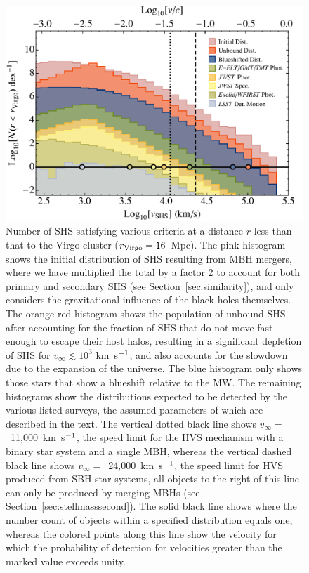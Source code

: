 \documentclass[a4paper,twocolumn]{emulateapj}
\begin{document}
{\begin{figure}
\centering\includegraphics[width=0.7\linewidth,clip=true]{histogram-2}
\caption{Number of SHS satisfying various criteria at a distance $r$ less than that to the Virgo cluster ($r_{\rm Virgo} = 16$~Mpc). The pink histogram shows the initial distribution of SHS resulting from MBH mergers, where we have multiplied the total by a factor 2 to account for both primary and secondary SHS (see Section~\ref{sec:similarity}), and only considers the gravitational influence of the black holes themselves. The orange-red histogram shows the population of unbound SHS after accounting for the fraction of SHS that do not move fast enough to escape their host halos, resulting in a significant depletion of SHS for $v_{\infty} \lesssim 10^{3}$ km~s$^{\smash{-1}}$, and also accounts for the slowdown due to the expansion of the universe. The blue histogram only shows those stars that show a blueshift relative to the MW. The remaining histograms show the distributions expected to be detected by the various listed surveys, the assumed parameters of which are described in the text. The vertical dotted black line shows $v_{\infty} =$~11,000~km~s$^{\smash{-1}}$, the speed limit for the HVS mechanism with a binary star system and a single MBH, whereas the vertical dashed black line shows $v_{\infty} =$~24,000~km~s$^{\smash{-1}}$, the speed limit for HVS produced from SBH-star systems, all objects to the right of this line can only be produced by merging MBHs (see Section~\ref{sec:stellmasssecond}). The solid black line shows where the number count of objects within a specified distribution equals one, whereas the colored points along this line show the velocity for which the probability of detection for velocities greater than the marked value exceeds unity.}
\label{fig:histogram2}
\end{figure}

}
\end{document}
